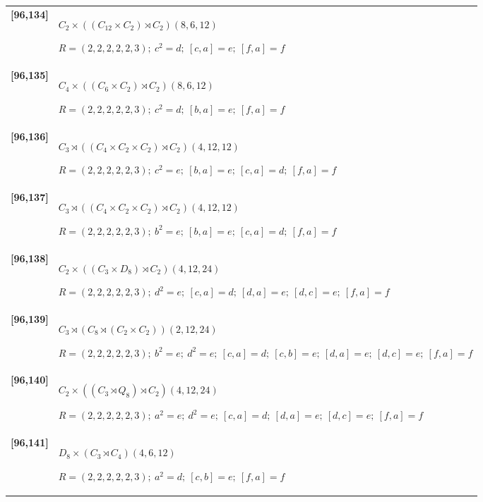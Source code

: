 \documentclass[UTF8,fontset=fandol,11pt,a4paper]{ctexart}
\begin{document}
\begin{longtable}{@{}p{17mm}>{\raggedright\arraybackslash}p{141mm}@{}}
\textbf{[96,134]} & $C_{2}\times ((C_{12}\times C_{2})\rtimes C_{2})$\quad $(8,6,12)$\par\(R=(2,2,2,2,2,3);\allowbreak\ c^{2}=d;\allowbreak\ [c,a]=e;\allowbreak\ [f,a]=f\)\\[3pt]

\textbf{[96,135]} & $C_{4}\times ((C_{6}\times C_{2})\rtimes C_{2})$\quad $(8,6,12)$\par\(R=(2,2,2,2,2,3);\allowbreak\ c^{2}=d;\allowbreak\ [b,a]=e;\allowbreak\ [f,a]=f\)\\[3pt]

\textbf{[96,136]} & $C_{3}\rtimes ((C_{4}\times C_{2}\times C_{2})\rtimes C_{2})$\quad $(4,12,12)$\par\(R=(2,2,2,2,2,3);\allowbreak\ c^{2}=e;\allowbreak\ [b,a]=e;\allowbreak\ [c,a]=d;\allowbreak\ [f,a]=f\)\\[3pt]

\textbf{[96,137]} & $C_{3}\rtimes ((C_{4}\times C_{2}\times C_{2})\rtimes C_{2})$\quad $(4,12,12)$\par\(R=(2,2,2,2,2,3);\allowbreak\ b^{2}=e;\allowbreak\ [b,a]=e;\allowbreak\ [c,a]=d;\allowbreak\ [f,a]=f\)\\[3pt]

\textbf{[96,138]} & $C_{2}\times ((C_{3}\times D_{8})\rtimes C_{2})$\quad $(4,12,24)$\par\(R=(2,2,2,2,2,3);\allowbreak\ d^{2}=e;\allowbreak\ [c,a]=d;\allowbreak\ [d,a]=e;\allowbreak\ [d,c]=e;\allowbreak\ [f,a]=f\)\\[3pt]

\textbf{[96,139]} & $C_{3}\rtimes (C_{8}\rtimes (C_{2}\times C_{2}))$\quad $(2,12,24)$\par\(R=(2,2,2,2,2,3);\allowbreak\ b^{2}=e;\allowbreak\ d^{2}=e;\allowbreak\ [c,a]=d;\allowbreak\ [c,b]=e;\allowbreak\ [d,a]=e;\allowbreak\ [d,c]=e;\allowbreak\ [f,a]=f\)\\[3pt]

\textbf{[96,140]} & $C_{2}\times ((C_{3}\rtimes Q_{8})\rtimes C_{2})$\quad $(4,12,24)$\par\(R=(2,2,2,2,2,3);\allowbreak\ a^{2}=e;\allowbreak\ d^{2}=e;\allowbreak\ [c,a]=d;\allowbreak\ [d,a]=e;\allowbreak\ [d,c]=e;\allowbreak\ [f,a]=f\)\\[3pt]

\textbf{[96,141]} & $D_{8}\times (C_{3}\rtimes C_{4})$\quad $(4,6,12)$\par\(R=(2,2,2,2,2,3);\allowbreak\ a^{2}=d;\allowbreak\ [c,b]=e;\allowbreak\ [f,a]=f\)\\[3pt]


\end{longtable}
\end{document}
